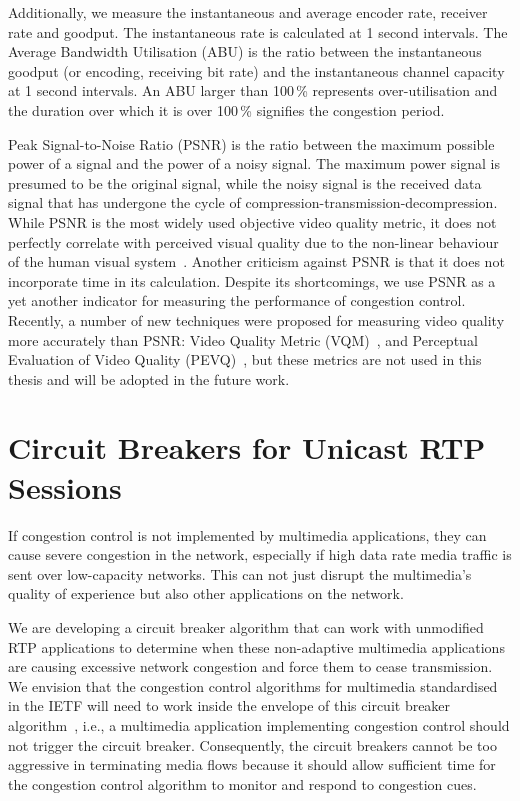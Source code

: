 Additionally, we measure the instantaneous and average encoder rate, receiver
rate and goodput. The instantaneous rate is calculated at 1 second intervals. The
Average Bandwidth Utilisation (ABU) is the ratio between the instantaneous
goodput (or encoding, receiving bit rate) and the instantaneous channel
capacity at 1 second intervals. An ABU larger than 100\,\% represents over-utilisation 
and the duration over which it is over 100\,\% signifies the congestion period.


Peak Signal-to-Noise Ratio (PSNR) is the ratio between the maximum possible
power of a signal and the power of a noisy signal. The maximum power signal is
presumed to be the original signal, while the noisy signal is the received data
signal that has undergone the cycle of compression-transmission-decompression.
While PSNR is the most widely used objective video quality metric, it does not
perfectly correlate with perceived visual quality due to the non-linear
behaviour of the human visual system~\cite{itu-t-j247}. Another criticism
against PSNR is that it does not incorporate time in its calculation. Despite
its shortcomings, we use PSNR as a yet another indicator for measuring the
performance of congestion control. Recently, a number of new techniques were
proposed for measuring video quality more accurately than PSNR: 
Video Quality Metric (VQM)~\cite{itu-t-j144}, and Perceptual Evaluation 
of Video Quality (PEVQ)~\cite{itu-t-j247, itu-t-j341}, but these metrics are not 
used in this thesis and will be adopted in the future work.



\section{Circuit Breakers for Unicast RTP Sessions}

If congestion control is not implemented by multimedia applications, they can
cause severe congestion in the network, especially if high data rate media
traffic is sent over low-capacity networks. This can not just disrupt the
multimedia's quality of experience but also other applications on the network.

We are developing a circuit breaker algorithm that can work with unmodified
RTP applications to determine when these non-adaptive multimedia
applications are causing excessive network congestion and force them to cease
transmission. We envision that the congestion control algorithms for
multimedia standardised in the IETF will need to work inside the envelope of
this circuit breaker algorithm~\cite{draft.rmcat.evaluate}, i.e., a multimedia
application implementing congestion control should not trigger the circuit
breaker. Consequently, the circuit breakers cannot be too aggressive in
terminating media flows because it should allow sufficient time for the
congestion control algorithm to monitor and respond to congestion cues.


